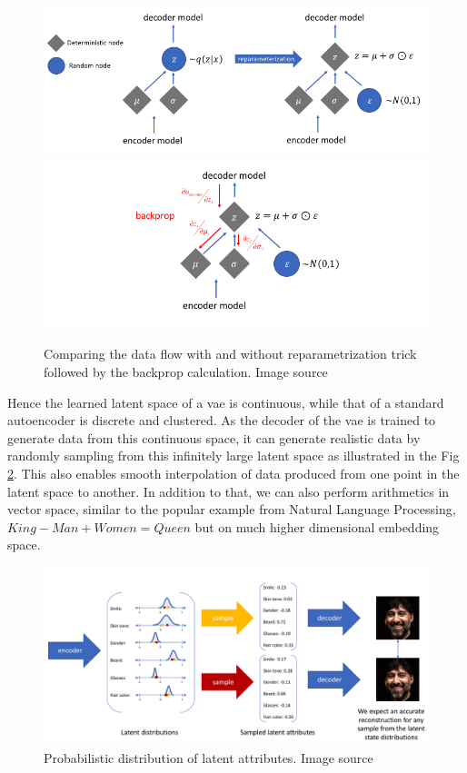 \begin{figure}[h]
    \centering
    \includegraphics[scale=0.5]{figures/background/reparametrization_trick.png}
    \includegraphics[scale=0.5]{figures/background/reparametrization_trick_backprop.png}
    \caption{Comparing the data flow with and without reparametrization trick followed by the backprop calculation. Image source \cite{jeremy_jordan_2018}}
    \label{fig:reparametrization_trick}
\end{figure}

Hence the learned latent space of a \ac{vae} is continuous, while that of a standard autoencoder is discrete and clustered. As the decoder of the \ac{vae} is trained to generate data from this continuous space, it can generate realistic data by randomly sampling from this infinitely large latent space as illustrated in the Fig \ref{fig:vae_latent_attribute}. This also enables smooth interpolation of data produced from one point in the latent space to another. In addition to that, we can also perform arithmetics in vector space, similar to the popular example from Natural Language Processing, $King - Man + Women = Queen$ but on much higher dimensional embedding space.

\begin{figure}[h]
    \centering
    \includegraphics[scale=0.4]{figures/background/vae_latent_attribute.png}
    \caption{Probabilistic distribution of latent attributes. Image source \cite{jeremy_jordan_2018}}
    \label{fig:vae_latent_attribute}
\end{figure}

